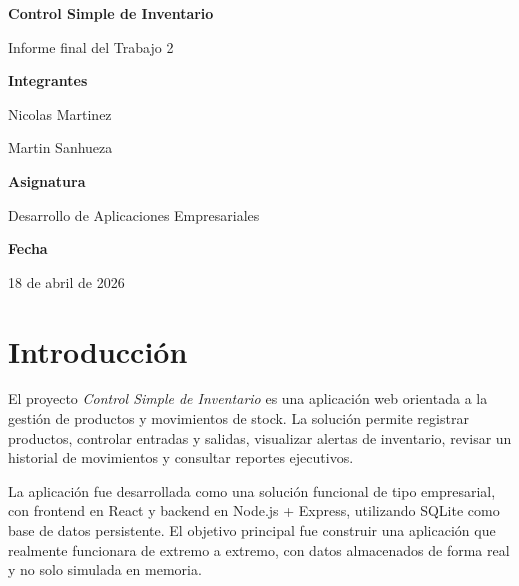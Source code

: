 \documentclass[12pt,a4paper]{article}
\begin{document}
\begin{titlepage}
    \centering
    \vspace*{2cm}

    {\LARGE \textbf{Control Simple de Inventario}\par}
    \vspace{0.6cm}
    {\Large Informe final del Trabajo 2\par}
    \vspace{1.5cm}

    {\large \textbf{Integrantes}\par}
    \vspace{0.3cm}
    {\large Nicolas Martinez\par}
    {\large Martin Sanhueza\par}

    \vspace{1.2cm}
    {\large \textbf{Asignatura}\par}
    \vspace{0.3cm}
    {\large Desarrollo de Aplicaciones Empresariales\par}

    \vspace{1.2cm}
    {\large \textbf{Fecha}\par}
    \vspace{0.3cm}
    {\large 18 de abril de 2026\par}

\end{titlepage}

\tableofcontents
\newpage

\section{Introducción}

El proyecto \textit{Control Simple de Inventario} es una aplicación web orientada a la gestión de productos y movimientos de stock. La solución permite registrar productos, controlar entradas y salidas, visualizar alertas de inventario, revisar un historial de movimientos y consultar reportes ejecutivos. 

La aplicación fue desarrollada como una solución funcional de tipo empresarial, con frontend en React y backend en Node.js + Express, utilizando SQLite como base de datos persistente. El objetivo principal fue construir una aplicación que realmente funcionara de extremo a extremo, con datos almacenados de forma real y no solo simulada en memoria.
\end{document}
